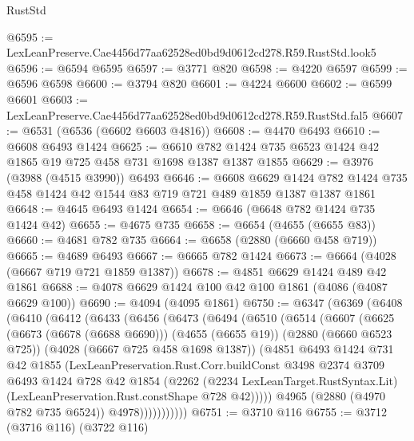 \begin{lexlean}{RustStd}
\begin{coremodule}
@6595 := LexLeanPreserve.Cae4456d77aa62528ed0bd9d0612cd278.R59.RustStd.look5
@6596 := @6594 @6595
@6597 := @3771 @820
@6598 := @4220 @6597
@6599 := @6596 @6598
@6600 := @3794 @820
@6601 := @4224 @6600
@6602 := @6599 @6601
@6603 := LexLeanPreserve.Cae4456d77aa62528ed0bd9d0612cd278.R59.RustStd.fal5
@6607 := @6531 (@6536 (@6602 @6603 @4816))
@6608 := @4470 @6493
@6610 := @6608 @6493 @1424
@6625 := @6610 @782 @1424 @735 @6523 @1424 @42 @1865 @19 @725 @458 @731 @1698 @1387 @1387 @1855
@6629 := @3976 (@3988 (@4515 @3990)) @6493
@6646 := @6608
    @6629
    @1424
    @782
    @1424
    @735
    @458
    @1424
    @42
    @1544
    @83
    @719
    @721
    @489
    @1859
    @1387
    @1387
    @1861
@6648 := @4645 @6493 @1424
@6654 := @6646 (@6648 @782 @1424 @735 @1424 @42)
@6655 := @4675 @735
@6658 := @6654 (@4655 (@6655 @83))
@6660 := @4681 @782 @735
@6664 := @6658 (@2880 (@6660 @458 @719))
@6665 := @4689 @6493
@6667 := @6665 @782 @1424
@6673 := @6664 (@4028 (@6667 @719 @721 @1859 @1387))
@6678 := @4851 @6629 @1424 @489 @42 @1861
@6688 := @4078 @6629 @1424 @100 @42 @100 @1861 (@4086 (@4087 @6629 @100))
@6690 := @4094 (@4095 @1861)
@6750 := @6347
    (@6369
      (@6408
        (@6410
          (@6412
            (@6433
              (@6456
                (@6473
                  (@6494
                    (@6510
                      (@6514
                        (@6607
                          (@6625
                            (@6673 (@6678 (@6688 @6690)))
                            (@4655 (@6655 @19))
                            (@2880 (@6660 @6523 @725))
                            (@4028 (@6667 @725 @458 @1698 @1387))
                            (@4851
                              @6493
                              @1424
                              @731
                              @42
                              @1855
                              (LexLeanPreservation.Rust.Corr.buildConst
                                @3498
                                @2374
                                @3709
                                @6493
                                @1424
                                @728
                                @42
                                @1854
                                (@2262
                                  (@2234 LexLeanTarget.RustSyntax.Lit)
                                  (LexLeanPreservation.Rust.constShape @728 @42)))))
                          @4965
                          (@2880 (@4970 @782 @735 @6524))
                          @4978)))))))))))
@6751 := @3710 @116
@6755 := @3712 (@3716 @116) (@3722 @116)

\end{coremodule}
\end{lexlean}

